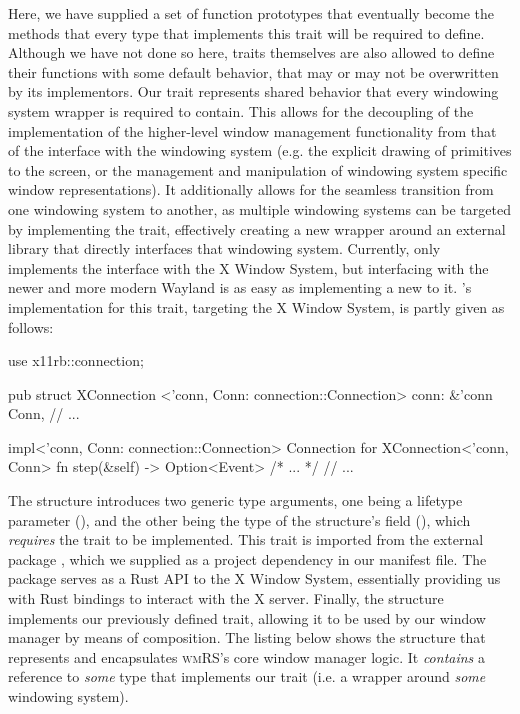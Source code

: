 Here, we have supplied a set of function prototypes that eventually become
the methods that every type that implements this trait will be required to
define. Although we have not done so here, traits themselves are also allowed
to define their functions with some default behavior, that may or may not
be overwritten by its implementors\cite{therustbook, rusttraitsdeepdive}.
Our  trait represents shared behavior that every windowing
system wrapper is required to contain. This allows for the decoupling of the
implementation of the higher-level window management functionality from that of
the interface with the windowing system (e.g. the explicit drawing of primitives
to the screen, or the management and manipulation of windowing system specific
window representations). It additionally allows for the seamless transition from
one windowing system to another, as multiple windowing systems can be targeted
by implementing the trait, effectively creating a new wrapper around an external
library that directly interfaces that windowing system. Currently, \wmrs only
implements the interface with the X Window System, but interfacing with the
newer and more modern Wayland\cite{wayland} is as easy as implementing a new
 to it. \wmrs's implementation for this trait, targeting the X
Window System, is partly given as follows:

\begin{rustblock}
  use x11rb::connection;
\end{rustblock}
\begin{rustblock}
  pub struct XConnection
    <'conn, Conn: connection::Connection>
  {
    conn: &'conn Conn,
    // ...
  }
\end{rustblock}
\begin{rustblock}
  impl<'conn, Conn: connection::Connection>
    Connection for XConnection<'conn, Conn>
  {
    fn step(&self) -> Option<Event> { /* ... */ }
    // ...
  }
\end{rustblock}

The  structure introduces two generic type arguments,
one being a lifetype parameter (), and the other being
the type of the structure's  field (), which
\textit{requires} the  trait to be implemented.
This  trait is imported from the external package
, which we supplied as a project dependency in our manifest file. The
 package serves as a Rust API to the X Window System, essentially
providing us with Rust bindings to interact with the X server. Finally, the
 structure implements our previously defined 
trait, allowing it to be used by our window manager by means of composition.
The listing below shows the structure that represents and encapsulates
\textsc{wmRS}'s core window manager logic. It \textit{contains} a reference to
\textit{some} type that implements our  trait (i.e. a wrapper
around \textit{some} windowing system).

